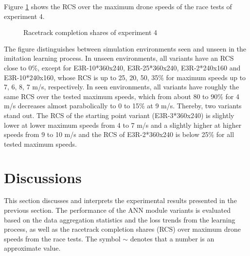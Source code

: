 Figure \ref{fig:e4_racing} shows the
RCS over the maximum drone speeds
of the race tests of experiment 4.
\begin{figure}
    \centering
    \hspace*{0cm}
    \par
    \caption[
        Racetrack completion shares of experiment 4
    ]{
        Racetrack completion shares of experiment 4
        \label{fig:e4_racing}
    }
\end{figure}
The figure distinguishes between simulation environments seen and unseen in the imitation learning process.
In unseen environments,
all variants have an RCS close to 0\%,
except for E3R-10*360x240, E3R-25*360x240, E3R-2*240x160 and E3R-10*240x160,
whose RCS is up to 25, 20, 50, 35\% for maximum speeds up to 7, 6, 8, 7 m/s, respectively.
In seen environments,
all variants have roughly the same RCS over the tested maximum speeds,
which from about 80 to 90\% for 4 m/s decreases
almost parabolically to 0 to 15\% at 9 m/s.
Thereby, two variants stand out.
The RCS of the starting point variant (E3R-3*360x240) 
is slightly lower at lower maximum speeds from 4 to 7 m/s 
and a slightly higher at higher speeds from 9 to 10 m/s
and the RCS of E3R-2*360x240 is below 25\% for all tested maximum speeds.






\section{Discussions}
\label{discussions}
This section discusses and interprets the experimental results presented in the previous section. 
The performance of the ANN module variants is evaluated based on the data aggregation statistics 
and the loss trends from the learning process, as well as the racetrack completion shares (RCS) over maximum drone speeds 
from the race tests. The symbol $\sim$ denotes that a number is an approximate value.

